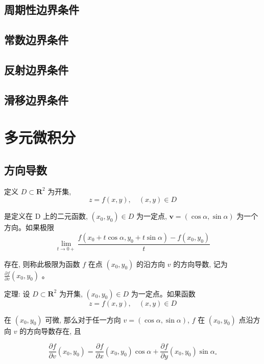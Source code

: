 \documentclass{book}
\begin{document}
\subsection{周期性边界条件}
\subsection{常数边界条件}
\subsection{反射边界条件}
\subsection{滑移边界条件}

\section{多元微积分}
\subsection{方向导数}
定义 $D \subset \mathbf{R}^{2}$  为开集,
\begin{equation}
    z=f(x, y), \quad(x, y) \in D
\end{equation}

是定义在  D  上的二元函数,  $\left(x_{0}, y_{0}\right) \in D$  为一定点,  $\boldsymbol{v}=(\cos \alpha, \sin \alpha)$  为一个方向。如果极限
\begin{equation}
    \lim _{t \rightarrow 0+} \frac{f\left(x_{0}+t \cos \alpha, y_{0}+t \sin \alpha\right)-f\left(x_{0}, y_{0}\right)}{t}
\end{equation}

存在, 则称此极限为函数  $f$  在点  $\left(x_{0}, y_{0}\right)$  的沿方向  $v$  的方向导数, 记为  $\frac{\partial f}{\partial v}\left(x_{0}, y_{0}\right)$  。

定理: 设  $D \subset \mathbf{R}^{2}$  为开集,  $\left(x_{0}, y_{0}\right) \in D$  为一定点。如果函数
\begin{equation}
    z=f(x, y), \quad(x, y) \in D
\end{equation}

在  $\left(x_{0}, y_{0}\right)$  可微, 那么对于任一方向  $v=(\cos \alpha, \sin \alpha)$, $f$  在  $\left(x_{0}, y_{0}\right)$  点沿方向  $v$ 的方向导数存在, 且

\begin{equation}
    \frac{\partial f}{\partial v}\left(x_{0}, y_{0}\right)=\frac{\partial f}{\partial x}\left(x_{0}, y_{0}\right) \cos \alpha+\frac{\partial f}{\partial y}\left(x_{0}, y_{0}\right) \sin \alpha_{\circ}
\end{equation}
\end{document}
